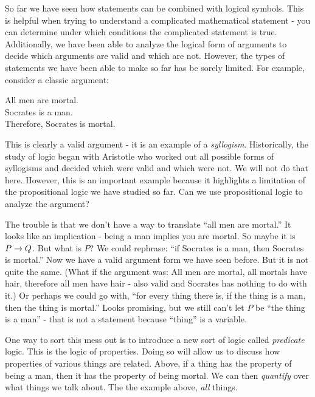 \documentclass[12pt]{article}
\begin{document}

So far we have seen how statements can be combined with logical symbols.  This is helpful when trying to understand a complicated mathematical statement - you can determine under which conditions the complicated statement is true.  Additionally, we have been able to analyze the logical form of arguments to decide which arguments are valid and which are not.  However, the types of statements we have been able to make so far has be sorely limited.  For example, consider a classic argument:

\begin{center}
 All men are mortal.\\ Socrates is a man. \\
 Therefore, Socrates is mortal.
\end{center}

This is clearly a valid argument - it is an example of a {\em syllogism}.  Historically, the study of logic began with Aristotle who worked out all possible forms of syllogisms and decided which were valid and which were not.  We will not do that here.  However, this is an important example because it highlights a limitation of the propositional logic we have studied so far.  Can we use propositional logic to analyze the argument?  

The trouble is that we don't have a way to translate ``all men are mortal.''  It looks like an implication - being a man implies you are mortal.  So maybe it is $P \rightarrow Q$.  But what is $P$?  We could rephrase: ``if Socrates is a man, then Socrates is mortal.''  Now we have a valid argument form we have seen before.  But it is not quite the same.  (What if the argument was: All men are mortal, all mortals have hair, therefore all men have hair - also valid and Socrates has nothing to do with it.)  Or perhaps we could go with, ``for every thing there is, if the thing is a man, then the thing is mortal.''  Looks promising, but we still can't let $P$ be ``the thing is a man'' - that is not a statement because ``thing'' is a variable.

One way to sort this mess out is to introduce a new sort of logic called {\em predicate} logic.  This is the logic of properties.  Doing so will allow us to discuss how properties of various things are related.  Above, if a thing has the property of being a man, then it has the property of being mortal.  We can then {\em quantify} over what things we talk about.  The the example above, {\em all} things.  
\end{document}
